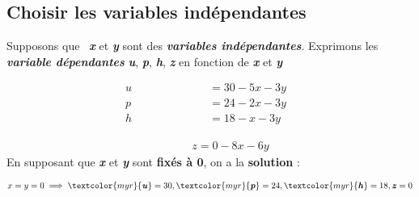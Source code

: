 \documentclass{report}
\newcommand{\Pointilles}[1]{%
  \par\nobreak
  \noindent\rule{0pt}{1.5\baselineskip}%
  \multido{}{#1}{\noindent\makebox[\linewidth]{\dotfill}\endgraf}%
  \bigskip%
}
\begin{document}
\begin{multicols*}{3}
\section{Choisir les variables indépendantes}
Supposons que \
\textcolor{myb}{\textbf{\textit{x}}} et 
\textcolor{myb}{\textbf{\textit{y}}} sont des 
\textcolor{myb}{\textbf{\textit{variables indépendantes}}}. Exprimons 
les \textcolor{myr}{\textbf{\textit{variable dépendantes}}} 
\textcolor{myr}{\textbf{\textit{u}}},
\textcolor{myr}{\textbf{\textit{p}}},
\textcolor{myr}{\textbf{\textit{h}}},
\textcolor{myr}{\textbf{\textit{z}}} en fonction de 
\textcolor{myb}{\textbf{\textit{x}}} et \textcolor{myb}{\textbf{\textit{y}}}


\begin{align*}
    u \quad\quad\quad\quad\quad\quad &= 30 - 5x -3y& \\
    p \quad\quad\quad\quad  &= 24 -2x -3y& \\
    h \quad\quad &= 18 - x -3y&
\end{align*}
\vspace{-2.5em}    
\Pointilles{1}
\vspace{-2.5em}
\begin{align*}
    \quad\quad\quad\;\; z = 0 -8x -6y
\end{align*}
En supposant que 
\textcolor{myb}{\textbf{\textit{x}}} et 
\textcolor{myb}{\textbf{\textit{y}}}  sont \textbf{fixés à 0}, 
on a la \textbf{solution} : 

\begin{align*}
x = y = 0 \implies 
\textcolor{myr}{\textbf{\textit{u}}}  = 30, 
\textcolor{myr}{\textbf{\textit{p}}} = 24,
\textcolor{myr}{\textbf{\textit{h}}} = 18,
\textbf{\textit{z}} = 0  
\end{align*}




\end{multicols*}
            
\end{document}
